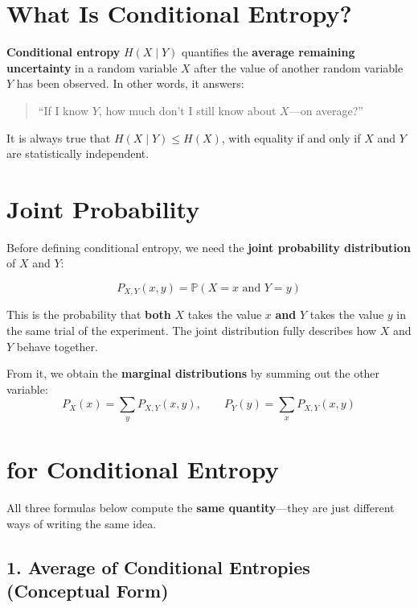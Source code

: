\documentclass[11pt]{article}
\begin{document}
\newpage







\section*{\texorpdfstring{\faLightbulb}{Intuition} What Is Conditional Entropy?}

\textbf{Conditional entropy} \(H(X \mid Y)\) quantifies the \textbf{average remaining uncertainty} in a random variable \(X\) after the value of another random variable \(Y\) has been observed. In other words, it answers:

\begin{quote}
``If I know \(Y\), how much don’t I still know about \(X\)—on average?''
\end{quote}

It is always true that \(H(X \mid Y) \leq H(X)\), with equality if and only if \(X\) and \(Y\) are statistically independent.

\section*{\texorpdfstring{\faKey}{Key Building Block} Joint Probability}

Before defining conditional entropy, we need the \textbf{joint probability distribution} of \(X\) and \(Y\):

\[
\boxed{P_{X,Y}(x, y) = \mathbb{P}(X = x \text{ and } Y = y)}
\]

This is the probability that \textbf{both} \(X\) takes the value \(x\) \textbf{and} \(Y\) takes the value \(y\) in the same trial of the experiment. The joint distribution fully describes how \(X\) and \(Y\) behave together.

From it, we obtain the \textbf{marginal distributions} by summing out the other variable:
\[
P_X(x) = \sum_{y} P_{X,Y}(x, y), \qquad
P_Y(y) = \sum_{x} P_{X,Y}(x, y)
\]

\section*{\texorpdfstring{\faRuler}{Three Equivalent Expressions} for Conditional Entropy}

All three formulas below compute the \textbf{same quantity}—they are just different ways of writing the same idea.

\subsection*{1. Average of Conditional Entropies (Conceptual Form)}
\end{document}
